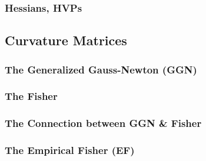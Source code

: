       \subsubsection{Hessians, HVPs}

      \subsection{Curvature Matrices}
      \subsubsection{The Generalized Gauss-Newton (GGN)}
      \subsubsection{The Fisher}
      \subsubsection{The Connection between GGN \& Fisher}
      \subsubsection{The Empirical Fisher (EF)}

